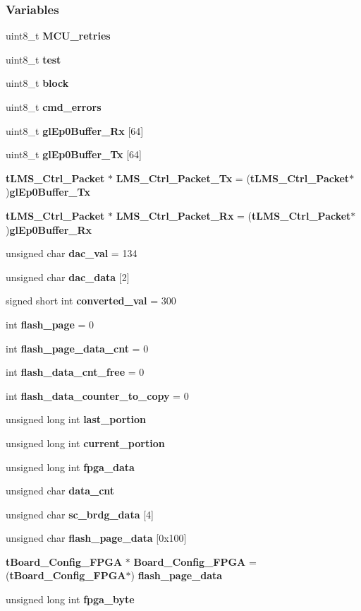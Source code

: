 \subsubsection*{Variables}
\begin{DoxyCompactItemize}
\item 
uint8\+\_\+t {\bf M\+C\+U\+\_\+retries}
\item 
uint8\+\_\+t {\bf test}
\item 
uint8\+\_\+t {\bf block}
\item 
uint8\+\_\+t {\bf cmd\+\_\+errors}
\item 
uint8\+\_\+t {\bf gl\+Ep0\+Buffer\+\_\+\+Rx} [64]
\item 
uint8\+\_\+t {\bf gl\+Ep0\+Buffer\+\_\+\+Tx} [64]
\item 
{\bf t\+L\+M\+S\+\_\+\+Ctrl\+\_\+\+Packet} $\ast$ {\bf L\+M\+S\+\_\+\+Ctrl\+\_\+\+Packet\+\_\+\+Tx} = ({\bf t\+L\+M\+S\+\_\+\+Ctrl\+\_\+\+Packet}$\ast$){\bf gl\+Ep0\+Buffer\+\_\+\+Tx}
\item 
{\bf t\+L\+M\+S\+\_\+\+Ctrl\+\_\+\+Packet} $\ast$ {\bf L\+M\+S\+\_\+\+Ctrl\+\_\+\+Packet\+\_\+\+Rx} = ({\bf t\+L\+M\+S\+\_\+\+Ctrl\+\_\+\+Packet}$\ast$){\bf gl\+Ep0\+Buffer\+\_\+\+Rx}
\item 
unsigned char {\bf dac\+\_\+val} = 134
\item 
unsigned char {\bf dac\+\_\+data} [2]
\item 
signed short int {\bf converted\+\_\+val} = 300
\item 
int {\bf flash\+\_\+page} = 0
\item 
int {\bf flash\+\_\+page\+\_\+data\+\_\+cnt} = 0
\item 
int {\bf flash\+\_\+data\+\_\+cnt\+\_\+free} = 0
\item 
int {\bf flash\+\_\+data\+\_\+counter\+\_\+to\+\_\+copy} = 0
\item 
unsigned long int {\bf last\+\_\+portion}
\item 
unsigned long int {\bf current\+\_\+portion}
\item 
unsigned long int {\bf fpga\+\_\+data}
\item 
unsigned char {\bf data\+\_\+cnt}
\item 
unsigned char {\bf sc\+\_\+brdg\+\_\+data} [4]
\item 
unsigned char {\bf flash\+\_\+page\+\_\+data} [0x100]
\item 
{\bf t\+Board\+\_\+\+Config\+\_\+\+F\+P\+GA} $\ast$ {\bf Board\+\_\+\+Config\+\_\+\+F\+P\+GA} = ({\bf t\+Board\+\_\+\+Config\+\_\+\+F\+P\+GA}$\ast$) {\bf flash\+\_\+page\+\_\+data}
\item 
unsigned long int {\bf fpga\+\_\+byte}
\end{DoxyCompactItemize}


